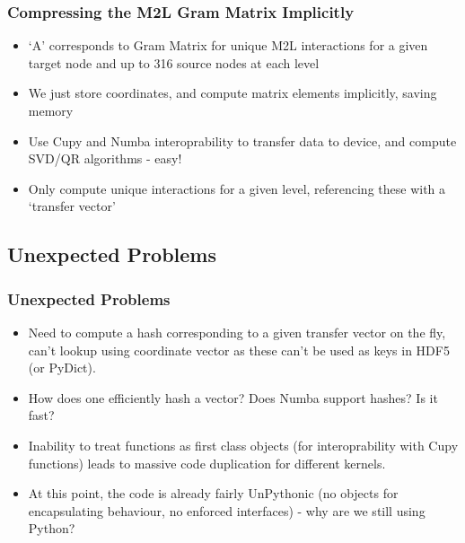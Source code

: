 \begin{frame}
    \frametitle{Compressing the M2L Gram Matrix Implicitly}
    \begin{itemize}
        \item `A' corresponds to Gram Matrix for unique M2L interactions for a given target node and up to 316 source nodes at each level
        \item We just store coordinates, and compute matrix elements implicitly, saving memory
        \item Use Cupy and Numba interoprability to transfer data to device, and compute SVD/QR algorithms - easy!
        \item Only compute unique interactions for a given level, referencing these with a `transfer vector' \cite{Fong_2009}
    \end{itemize}
\end{frame}

\subsection{Unexpected Problems}

\begin{scriptsize}
\begin{frame}
    \frametitle{Unexpected Problems}
    \begin{itemize}
        \item Need to compute a hash corresponding to a given transfer vector on the fly, can't lookup using coordinate vector as these can't be used as keys in HDF5 (or PyDict).
        \item How does one efficiently hash a vector? Does Numba support hashes? Is it fast?
        \item Inability to treat functions as first class objects (for interoprability with Cupy functions) leads to massive code duplication for different kernels.
        \item At this point, the code is already fairly UnPythonic (no objects for encapsulating behaviour, no enforced interfaces) - why are we still using Python?
    \end{itemize}
\end{frame}

\end{scriptsize}


